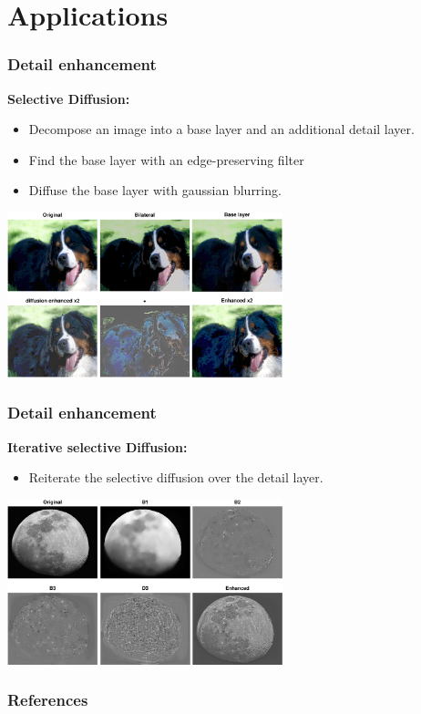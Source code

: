 \documentclass [10 pt, xcolor=pdftex,x11names,table]{beamer}
\begin{document}
\section{Applications}

\begin{frame}
\frametitle{Detail enhancement}
     \textbf{Selective Diffusion:}\\
     \begin{itemize}
     \item Decompose an image into a base layer and an additional detail layer.
     \item Find the base layer with an edge-preserving filter
     \item Diffuse the base layer with gaussian blurring.
     \end{itemize}
\begin{center}
    \includegraphics[width=8cm]{dog}
    \end{center}
\end{frame}

\begin{frame}
\frametitle{Detail enhancement}
     \textbf{Iterative selective Diffusion:}\\
     \begin{itemize}
     \item Reiterate the selective diffusion over the detail layer.
     \end{itemize}
    \begin{center}\end{center}

\begin{center}
    \includegraphics[width=8cm]{moon}
    \end{center}
\end{frame}

\begin{frame}[allowframebreaks]
\frametitle{References}


\nocite{*}


\end{frame}
\end{document}
